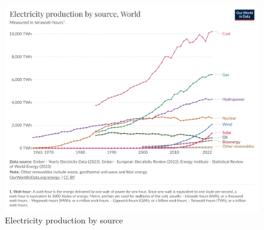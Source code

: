 \begin{figure}[!h]
    \includegraphics[width=\textwidth]{images/electricity-production-by-source.png}
    \caption{Electricity production by source}    
    \label{fig:electricity_production_by_source}
\end{figure}

